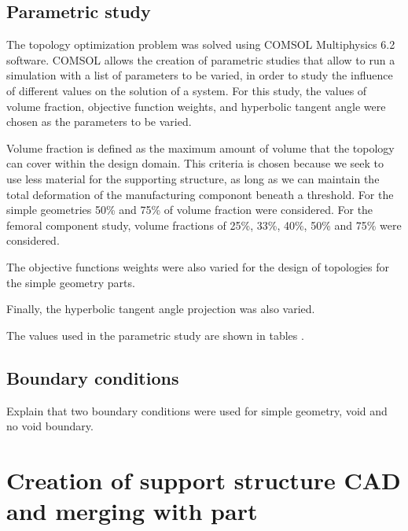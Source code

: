 \documentclass[../main.tex]{subfiles}
\begin{document}
\subsection{Parametric study}

The topology optimization problem was solved using COMSOL Multiphysics 6.2 software. COMSOL allows the creation of parametric studies that allow to run a simulation with a list of parameters to be varied, in order to study the influence of different values on the solution of a system. For this study, the values of volume fraction, objective function weights, and hyperbolic tangent angle were chosen as the parameters to be varied.

Volume fraction is defined as the maximum amount of volume that the topology can cover within the design domain. This criteria is chosen because we seek to use less material for the supporting structure, as long as we can maintain the total deformation of the manufacturing componont beneath a threshold. For the simple geometries 50\% and 75\% of volume fraction were considered. For the femoral component study, volume fractions of 25\%, 33\%, 40\%, 50\% and 75\% were considered. 

The objective functions weights were also varied for the design of topologies for the simple geometry parts. 

Finally, the hyperbolic tangent angle projection was also varied. 

The values used in the parametric study are shown in tables .


\subsection{Boundary conditions}

Explain that two boundary conditions were used for simple geometry, void and no void boundary.



\section{Creation of support structure CAD and merging with part}
\end{document}
